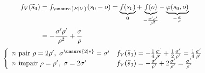 \[
\begin{aligned}
f_V(\widetilde s_0)
&=f_{\unsure{E|V}}(s_0-o)
=\underbrace{f(s_0)}_0+
\underbrace{f(o)}_{-\frac{\sigma'\rho'}{\rho^2}}
-\underbrace{\varphi(s_0,o)}_{-\frac{\sigma}{\rho}}\\
&=-\frac{\sigma'\rho'}{\rho^2}+\frac{\sigma}{\rho}
\end{aligned}
\]
\[
\left\{\begin{array}{ll}
n\text{ pair }\rho=2\rho',\ \sigma^{\unsure{2|*}}=\sigma'
&
f_V(\widetilde s_0)=-\frac14\frac{\sigma'}{\rho'}
+\frac12\frac{\sigma'}{\rho'}=\frac14\frac{\sigma'}{\rho'}\\
n\text{ impair }\rho=\rho',\ \sigma=2\sigma'
&
f_V(\widetilde s_0)=-\frac{\sigma'}{\rho'}
+2\frac{\sigma'}{\rho'}=\frac{\sigma'}{\rho'}
\end{array}\right.
\]

